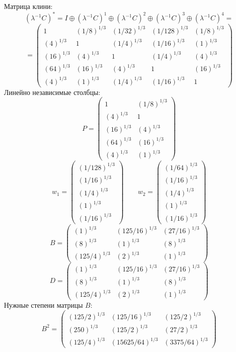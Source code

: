 Матрица клини:
$$(\lambda^{-1}C)^* = I \oplus (\lambda^{-1}C)^1 \oplus (\lambda^{-1}C)^2 \oplus (\lambda^{-1}C)^3 \oplus (\lambda^{-1}C)^4 = $$
$$ = \begin{pmatrix}
1 & (1/8)^{1/3} & (1/32)^{1/3} & (1/128)^{1/3} & (1/8)^{1/3}\\
(4)^{1/3} & 1 & (1/4)^{1/3} & (1/16)^{1/3} & (1)^{1/3}\\
(16)^{1/3} & (4)^{1/3} & 1 & (1/4)^{1/3} & (4)^{1/3}\\
(64)^{1/3} & (16)^{1/3} & (4)^{1/3} & 1 & (16)^{1/3}\\
(4)^{1/3} & (1)^{1/3} & (1/4)^{1/3} & (1/16)^{1/3} & 1
\end{pmatrix}
$$
Линейно независимые столбцы:
$$P = \begin{pmatrix}
1 & (1/8)^{1/3}\\
(4)^{1/3} & 1\\
(16)^{1/3} & (4)^{1/3}\\
(64)^{1/3} & (16)^{1/3}\\
(4)^{1/3} & (1)^{1/3}
\end{pmatrix}
$$
$$w_1 = \begin{pmatrix}
(1/128)^{1/3}\\
(1/16)^{1/3}\\
(1/4)^{1/3}\\
(1)^{1/3}\\
(1/16)^{1/3}
\end{pmatrix}
\qquad w_2 = \begin{pmatrix}
(1/64)^{1/3}\\
(1/16)^{1/3}\\
(1/4)^{1/3}\\
(1)^{1/3}\\
(1/16)^{1/3}
\end{pmatrix}
$$
$$B = \begin{pmatrix}
(1)^{1/3} & (125/16)^{1/3} & (27/16)^{1/3}\\
(8)^{1/3} & (1)^{1/3} & (8)^{1/3}\\
(125/4)^{1/3} & (2)^{1/3} & (1)^{1/3}
\end{pmatrix}
$$
$$D = \begin{pmatrix}
(1)^{1/3} & (125/16)^{1/3} & (27/16)^{1/3}\\
(8)^{1/3} & (1)^{1/3} & (8)^{1/3}\\
(125/4)^{1/3} & (2)^{1/3} & (1)^{1/3}
\end{pmatrix}
$$
Нужные степени матрицы $B$:
$$B^2 = \begin{pmatrix}
(125/2)^{1/3} & (125/16)^{1/3} & (125/2)^{1/3}\\
(250)^{1/3} & (125/2)^{1/3} & (27/2)^{1/3}\\
(125/4)^{1/3} & (15625/64)^{1/3} & (3375/64)^{1/3}
\end{pmatrix}
$$
